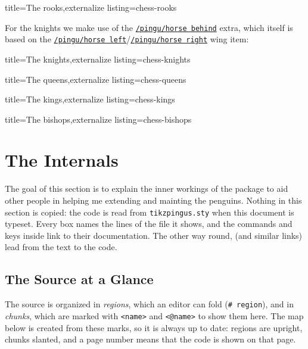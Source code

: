 \documentclass[parskip=half,english,numbers=noenddot,footnotes=nomultiple,oneside,fontsize=10pt,DIV=15,headinclude]{scrartcl}
\makeatletter
\def\pingu@listing@text{}
\def\lpingu#1{\begingroup\def\pingu@listing@text{#1}\lstinline[style=lstpingu,breakatwhitespace]'#1'\endgroup}
\newcommand*\keyref[2][/pingu/]{\hyperref[pk:#1#2]{\lpingu{#1#2}}}
\makeatother
\begin{document}
{{{{{{%
\begin{tcblisting}{title={The rooks},externalize listing=chess-rooks}
\tikz{\pingu[body=pingu@black,rook]}
\tikz{\pingu[:back,rook,rook hatch=false]}
\end{tcblisting}

For the knights we make use of the \keyref{horse behind} extra, which itself is based on the \keyref{horse left}/\keyref{horse right} wing item:
\begin{tcblisting}{title={The knights},externalize listing=chess-knights}
\tikz{\pingu[body=pingu@black,horse behind]}
\tikz{\pingu[:back,horse behind=pingu@black,on horse flip]}
\end{tcblisting}

\begin{tcblisting}{title={The queens},externalize listing=chess-queens}
\tikz{\pingu[body=pingu@black,princess crown=pingu@bronze]}
\tikz{\pingu[:back,princess crown=pingu@bronze]}
\end{tcblisting}


\begin{tcblisting}{title={The kings},externalize listing=chess-kings}
\tikz{\pingu[body=pingu@black,crown]}
\end{tcblisting}


\begin{tcblisting}{title={The bishops},externalize listing=chess-bishops}
\tikz{\pingu[body=pingu@black,cross left=pingu@black,mitra]}
\end{tcblisting}

\section{The Internals}\label{internals}
The goal of this section is to explain the inner workings of the package to aid other people in helping me extending and mainting the penguins.
Nothing in this section is copied: the code is read from \texttt{tikzpingus.sty} when this document is typeset. Every box names the lines of the file it shows, and the commands and keys inside link to their documentation. The other way round,  (and similar links) lead from the text to the code.

\subsection{The Source at a Glance}
The source is organized in \emph{regions}, which an editor can fold (\texttt{\# region}), and in \emph{chunks}, which are marked with \texttt{<name>} and \texttt{<@name>} to show them here. The map below is created from these marks, so it is always up to date: regions are upright, chunks slanted, and a page number means that the code is shown on that page.
\SourceMap

}}}}}}
\end{document}
